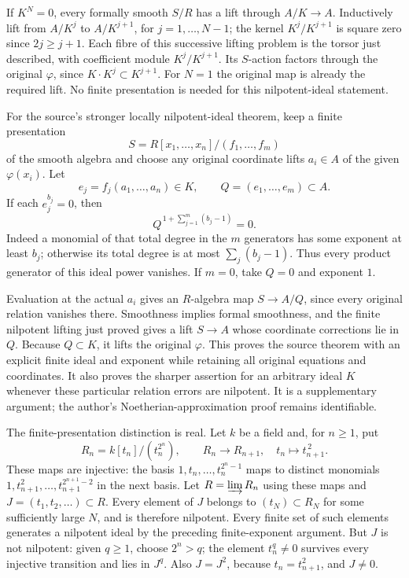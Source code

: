 If \(K^N=0\), every formally smooth \(S/R\) has a lift through \(A/K\to A\). Inductively lift from \(A/K^j\) to \(A/K^{j+1}\), for \(j=1,\ldots,N-1\); the kernel \(K^j/K^{j+1}\) is square zero since \(2j\ge j+1\). Each fibre of this successive lifting problem is the torsor just described, with coefficient module \(K^j/K^{j+1}\). Its \(S\)-action factors through the original \(\varphi\), since \(K\cdot K^j\subset K^{j+1}\). For \(N=1\) the original map is already the required lift. No finite presentation is needed for this nilpotent-ideal statement.

For the source's stronger locally nilpotent-ideal theorem, keep a finite presentation \[
S=R[x_1,\ldots,x_n]/(f_1,\ldots,f_m)
\] of the smooth algebra and choose any original coordinate lifts \(a_i\in A\) of the given \(\varphi(x_i)\). Let \[
e_j=f_j(a_1,\ldots,a_n)\in K,\qquad Q=(e_1,\ldots,e_m)\subset A.
\] If each \(e_j^{b_j}=0\), then \[
Q^{\,1+\sum_{j=1}^m(b_j-1)}=0.
\] Indeed a monomial of that total degree in the \(m\) generators has some exponent at least \(b_j\); otherwise its total degree is at most \(\sum_j(b_j-1)\). Thus every product generator of this ideal power vanishes. If \(m=0\), take \(Q=0\) and exponent \(1\).

Evaluation at the actual \(a_i\) gives an \(R\)-algebra map \(S\to A/Q\), since every original relation vanishes there. Smoothness implies formal smoothness, and the finite nilpotent lifting just proved gives a lift \(S\to A\) whose coordinate corrections lie in \(Q\). Because \(Q\subset K\), it lifts the original \(\varphi\). This proves the source theorem with an explicit finite ideal and exponent while retaining all original equations and coordinates. It also proves the sharper assertion for an arbitrary ideal \(K\) whenever these particular relation errors are nilpotent. It is a supplementary argument; the author's Noetherian-approximation proof remains identifiable.

The finite-presentation distinction is real. Let \(k\) be a field and, for \(n\ge1\), put \[
R_n=k[t_n]/(t_n^{2^n}),\qquad
R_n\longrightarrow R_{n+1},\quad t_n\longmapsto t_{n+1}^{\,2}.
\] These maps are injective: the basis \(1,t_n,\ldots,t_n^{2^n-1}\) maps to distinct monomials \(1,t_{n+1}^{2},\ldots,t_{n+1}^{2^{n+1}-2}\) in the next basis. Let \(R=\varinjlim R_n\) using these maps and \(J=(t_1,t_2,\ldots)\subset R\). Every element of \(J\) belongs to \((t_N)\subset R_N\) for some sufficiently large \(N\), and is therefore nilpotent. Every finite set of such elements generates a nilpotent ideal by the preceding finite-exponent argument. But \(J\) is not nilpotent: given \(q\ge1\), choose \(2^n>q\); the element \(t_n^q\ne0\) survives every injective transition and lies in \(J^q\). Also \(J=J^2\), because \(t_n=t_{n+1}^2\), and \(J\ne0\).

